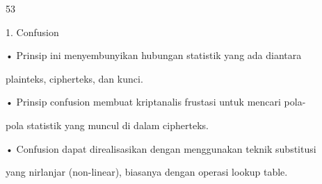\documentclass{article}
\begin{document}

53

1. Confusion

• Prinsip ini menyembunyikan hubungan statistik yang ada diantara 

plainteks, cipherteks, dan kunci. 


• Prinsip confusion membuat kriptanalis frustasi untuk mencari pola-

pola statistik yang muncul di dalam cipherteks. 

• Confusion dapat direalisasikan dengan menggunakan teknik substitusi 

yang nirlanjar (non-linear), biasanya dengan operasi lookup table.
\end{document}
